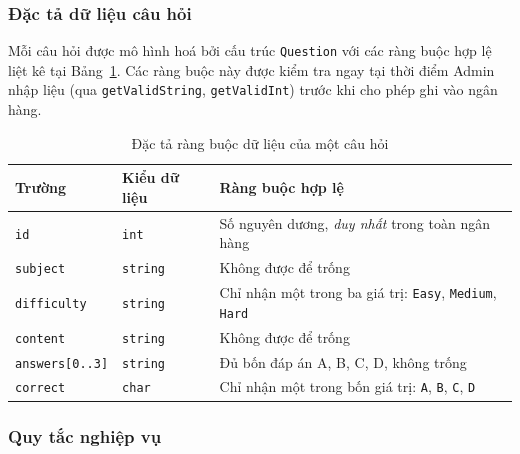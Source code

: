 \documentclass[11pt]{report}
\begin{document}
\subsubsection{Đặc tả dữ liệu câu hỏi}

Mỗi câu hỏi được mô hình hoá bởi cấu trúc \texttt{Question} với các ràng buộc hợp lệ liệt kê tại Bảng~\ref{tab:question_fields}. Các ràng buộc này được kiểm tra ngay tại thời điểm Admin nhập liệu (qua \texttt{getValidString}, \texttt{getValidInt}) trước khi cho phép ghi vào ngân hàng.

\begin{table}[H]
    \centering
    \begin{tabularx}{\textwidth}{|l|l|X|} \hline
        \textbf{Trường} & \textbf{Kiểu dữ liệu} & \textbf{Ràng buộc hợp lệ} \\ \hline
        \texttt{id} & \texttt{int} & Số nguyên dương, \textit{duy nhất} trong toàn ngân hàng \\ \hline
        \texttt{subject} & \texttt{string} & Không được để trống \\ \hline
        \texttt{difficulty} & \texttt{string} & Chỉ nhận một trong ba giá trị: \texttt{Easy}, \texttt{Medium}, \texttt{Hard} \\ \hline
        \texttt{content} & \texttt{string} & Không được để trống \\ \hline
        \texttt{answers[0..3]} & \texttt{string} & Đủ bốn đáp án A, B, C, D, không trống \\ \hline
        \texttt{correct} & \texttt{char} & Chỉ nhận một trong bốn giá trị: \texttt{A}, \texttt{B}, \texttt{C}, \texttt{D} \\ \hline
    \end{tabularx}
    \caption{Đặc tả ràng buộc dữ liệu của một câu hỏi}
    \label{tab:question_fields}
\end{table}

\subsubsection{Quy tắc nghiệp vụ}
\end{document}
